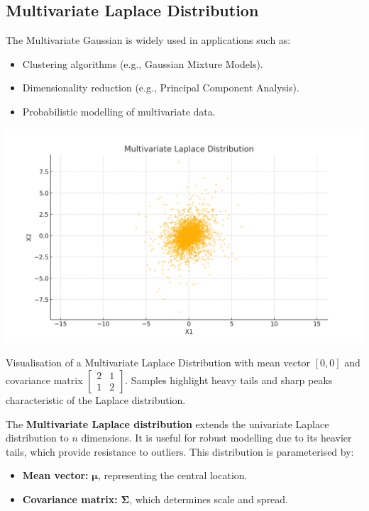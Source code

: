 
\subsection{Multivariate Laplace Distribution}
The Multivariate Gaussian is widely used in applications such as:
\begin{itemize}
    \item Clustering algorithms (e.g., Gaussian Mixture Models).
    \item Dimensionality reduction (e.g., Principal Component Analysis).
    \item Probabilistic modelling of multivariate data.
\end{itemize}
\begin{marginfigure}
    \includegraphics[width=\linewidth]{img/multivariate_laplace_distribution.png}
    \caption{Visualisation of a Multivariate Laplace Distribution with mean vector \([0, 0]\) and covariance matrix \(\begin{bmatrix} 2 & 1 \\ 1 & 2 \end{bmatrix}\). Samples highlight heavy tails and sharp peaks characteristic of the Laplace distribution.}
    \label{fig:multivariate_laplace}
\end{marginfigure}



The \textbf{Multivariate Laplace distribution} extends the univariate Laplace distribution to $n$ dimensions. It is useful for robust modelling due to its heavier tails, which provide resistance to outliers. This distribution is parameterised by:
\begin{itemize}
    \item \textbf{Mean vector:} $\boldsymbol{\mu}$, representing the central location.
    \item \textbf{Covariance matrix:} $\boldsymbol{\Sigma}$, which determines scale and spread.
\end{itemize}

